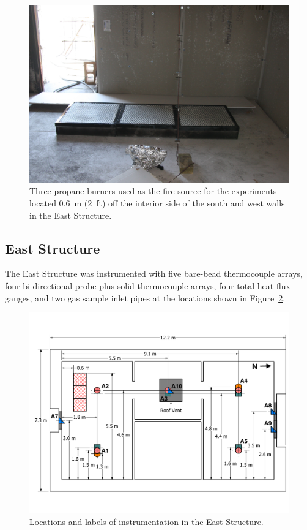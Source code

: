 \begin{figure}[!h]
	\centering
	\includegraphics[width=0.9\columnwidth]{Figures/Pictures/burners}
	\caption[Three propane burners used as the fuel source.]{Three propane burners used as the fire source for the experiments located 0.6~m (2~ft) off the interior side of the south and west walls in the East Structure.}
	\label{fig:burners}
\end{figure}
\FloatBarrier
\subsection{East Structure}

The East Structure was instrumented with five bare-bead thermocouple arrays, four bi-directional probe plus solid thermocouple arrays, four total heat flux gauges, and two gas sample inlet pipes at the locations shown in Figure~\ref{fig:east_instrumentation}.

\begin{figure}[!h]
	\centering
	\includegraphics[width=\columnwidth]{Figures/Floor_Plans/East_Structure_Dimensioned_Instrumentation_New}
	\caption[Locations and labels of instrumentation in the East Structure]{Locations and labels of instrumentation in the East Structure.}
	\label{fig:east_instrumentation}
\end{figure}

